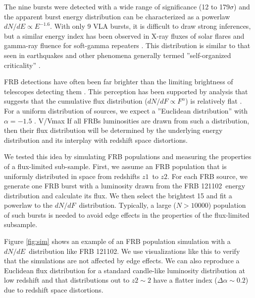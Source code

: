 \documentclass[twocolumn]{aastex61}
\newcommand{\frb}{FRB 121102}
\begin{document}
The nine bursts were detected with a wide range of significance (12 to 179$\sigma$) and the apparent burst energy distribution can be characterized as a powerlaw $dN/dE\propto E^{-1.6}$. With only 9 VLA bursts, it is difficult to draw strong inferences, but a similar energy index has been observed in X-ray fluxes of solar flares \citep{2011SoPh..274...99A} and gamma-ray fluence for soft-gamma repeaters \citep{2000ApJ...532L.121G, 2011ApJ...739...94S}. This distribution is similar to that seen in earthquakes and other phenomena generally termed ''self-organized criticality'' \citep{2011SoPh..274...99A}.

FRB detections have often been far brighter than the limiting brightness of telescopes detecting them \citep{2007Sci...318..777L, 2016arXiv161105758R}. This perception has been supported by analysis that suggests that the cumulative flux distribution ($dN/dF \propto F^{\alpha}$) is relatively flat \citep[$-0.5<\alpha<-0.9$;][]{2016ApJ...830...75V, 2016arXiv160206099L, 2016arXiv161100458L}. For a uniform distribution of sources, we expect a ''Euclidean distribution'' with $\alpha=-1.5$ \citep{2016MNRAS.462..941L}.
V/Vmax
If all FRBs luminosities are drawn from such a distribution, then their flux distribution will be determined by the underlying energy distribution and its interplay with redshift space distortions.


We tested this idea by simulating FRB populations and measuring the properties of a flux-limited sub-sample. First, we assume an FRB population that is uniformly distributed in space from redshifts $z1$\ to $z2$. For each FRB source, we generate one FRB burst with a luminosity drawn from the \frb\ energy distribution and calculate its flux. We then select the brightest 15 \citep[equal to the current sample size used in modeling;][]{2016ApJ...830...75V} and fit a powerlaw to the $dN/dF$\ distribution. Typically, a large ($N>10000$) population of such bursts is needed to avoid edge effects in the properties of the flux-limited subsample. 

Figure \ref{fig:sim} shows an example of an FRB population simulation with a $dN/dE$\ distribution like \frb. We use visualizations like this to verify that the simulations are not affected by edge effects. We can also reproduce a Euclidean flux distribution for a standard candle-like luminosity distribution at low redshift and that distributions out to $z2\sim2$ have a flatter index ($\Delta\alpha\sim0.2$) due to redshift space distortions.
\end{document}
